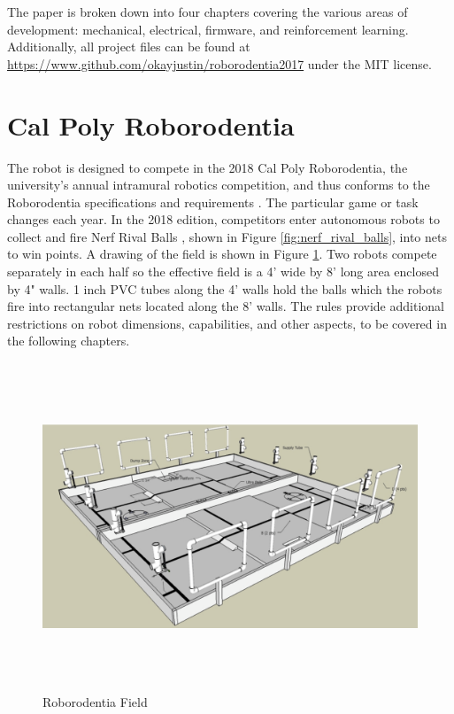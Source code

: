  The paper is broken down into four chapters covering the various areas of development: mechanical, electrical, firmware, and reinforcement learning. Additionally, all project files can be found at \url{https://www.github.com/okayjustin/roborodentia2017} under the MIT license.


\section{Cal Poly Roborodentia}
The robot is designed to compete in the 2018 Cal Poly Roborodentia, the university's annual intramural robotics competition, and thus conforms to the Roborodentia specifications and requirements \cite{roborodentia}. The particular game or task changes each year. In the 2018 edition, competitors enter autonomous robots to collect and fire Nerf Rival Balls \cite{hasbro_2018}, shown in Figure \ref{fig:nerf_rival_balls}, into nets to win points. A drawing of the field is shown in Figure \ref{fig:roborodentia_field}. Two robots compete separately in each half so the effective field is a 4' wide by 8' long area enclosed by 4" walls. 1 inch PVC tubes along the 4' walls hold the balls which the robots fire into rectangular nets located along the 8' walls. The rules provide additional restrictions on robot dimensions, capabilities, and other aspects, to be covered in the following chapters.
\begin{figure}[H]   %
	\centering \includegraphics[width=6in, height=3.85in, keepaspectratio]{figures/roborodentia_field.png}
	\caption{Roborodentia Field \cite{roborodentia}}	\label{fig:roborodentia_field}
\end{figure}
